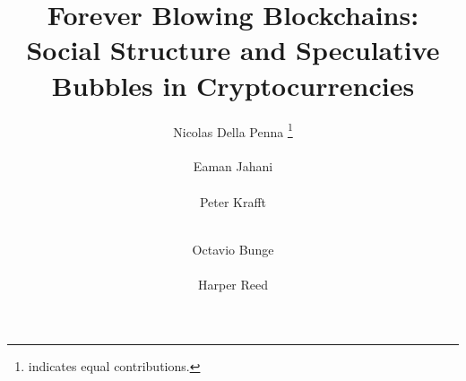 \documentclass{acm_proc_article_sp}%
\begin{document}
\title{Forever Blowing Blockchains: Social Structure and Speculative Bubbles in Cryptocurrencies}

%
\author{
%
%
\alignauthor
Nicolas Della Penna \thanks{indicates equal contributions.}\\
       \\
\alignauthor
Eaman Jahani \footnotemark[1] \\
        \\
\alignauthor
Peter Krafft \\%
        \\
\and  %
\alignauthor
Octavio Bunge \\%
        \\
\alignauthor 
Harper Reed \\%
}
\end{document}

